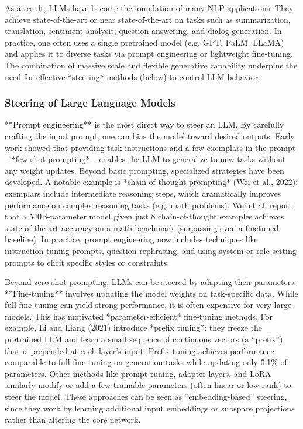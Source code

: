 As a result, LLMs have become the foundation of many NLP applications.  They achieve state-of-the-art or near state-of-the-art on tasks such as summarization, translation, sentiment analysis, question answering, and dialog generation.  In practice, one often uses a single pretrained model (e.g. GPT, PaLM, LLaMA) and applies it to diverse tasks via prompt engineering or lightweight fine-tuning.  The combination of massive scale and flexible generative capability underpins the need for effective *steering* methods (below) to control LLM behavior.

\subsubsection{Steering of Large Language Models}

**Prompt engineering** is the most direct way to steer an LLM.  By carefully crafting the input prompt, one can bias the model toward desired outputs.  Early work showed that providing task instructions and a few exemplars in the prompt – *few-shot prompting* – enables the LLM to generalize to new tasks without any weight updates.  Beyond basic prompting, specialized strategies have been developed.  A notable example is *chain-of-thought prompting* (Wei et al., 2022): exemplars include intermediate reasoning steps, which dramatically improves performance on complex reasoning tasks (e.g. math problems).  Wei et al. report that a 540B-parameter model given just 8 chain-of-thought examples achieves state-of-the-art accuracy on a math benchmark (surpassing even a finetuned baseline).  In practice, prompt engineering now includes techniques like instruction-tuning prompts, question rephrasing, and using system or role-setting prompts to elicit specific styles or constraints.

Beyond zero-shot prompting, LLMs can be steered by adapting their parameters.  **Fine-tuning** involves updating the model weights on task-specific data.  While full fine-tuning can yield strong performance, it is often expensive for very large models.  This has motivated *parameter-efficient* fine-tuning methods.  For example, Li and Liang (2021) introduce *prefix tuning*: they freeze the pretrained LLM and learn a small sequence of continuous vectors (a “prefix”) that is prepended at each layer’s input.  Prefix-tuning achieves performance comparable to full fine-tuning on generation tasks while updating only \~0.1\% of parameters. Other methods like prompt-tuning, adapter layers, and LoRA similarly modify or add a few trainable parameters (often linear or low-rank) to steer the model.  These approaches can be seen as “embedding-based” steering, since they work by learning additional input embeddings or subspace projections rather than altering the core network.

